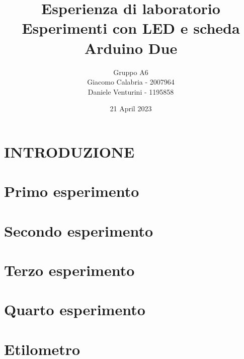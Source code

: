 \documentclass{article}
\title{Esperienza di laboratorio\\\textbf{Esperimenti con LED e scheda Arduino Due}}
\author{Gruppo A6\\Giacomo Calabria - 2007964\\Daniele Venturini - 1195858}
\date{21 April 2023}
\begin{document}
    \maketitle
    \tableofcontents
    \clearpage
    
    \section*{INTRODUZIONE}
    
    \clearpage
    
    \section{Primo esperimento}
    
    \clearpage
    
    \section{Secondo esperimento}
    
    \clearpage
    
    \section{Terzo esperimento}
    
    \clearpage
    
    \section{Quarto esperimento}
    
    \clearpage

    \section{Etilometro}
    
\end{document}

